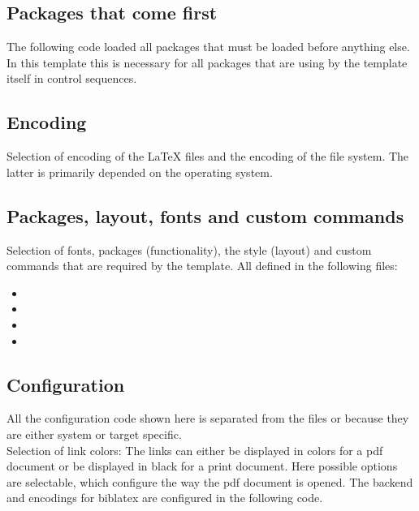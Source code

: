 \subsection{Packages that come first}
The following code loaded all packages that must be loaded before anything else. In this template this is necessary for all packages that are using by the template itself in control sequences.

\subsection{Encoding}
Selection of encoding of the LaTeX files and the encoding of the file system. The latter is primarily depended on the operating system.

\subsection{Packages, layout, fonts and custom commands}
Selection of fonts, packages (functionality), the style (layout) and custom 
commands that are required by the template. All defined in the following files:
%
\begin{itemize}[noitemsep]
\item {}
\item {}
\item {}
\item {}
\end{itemize}


\subsection{Configuration}
\label{sec:main:Configuration}
All the configuration code shown here is separated from the files  or  because they are either system or target specific.
\medskip\\\noindent
%
Selection of link colors: The links can either be displayed in colors for a pdf document or be displayed in black for a print document.
%
Here possible options are selectable, which configure the way the pdf document is opened.
%
The backend and encodings for biblatex are configured in the following code.

